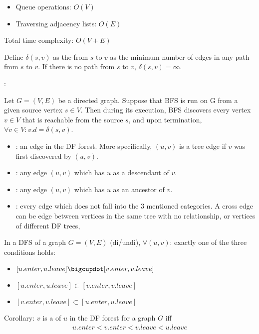     \begin{itemize}
      \item Queue operations: $O(V)$
      \item Traversing adjacency lists: $O(E)$
    \end{itemize}
    \par Total time complexity: $O(V + E)$

    \par Define $\delta(s, v)$ as the  from
      $s$ to $v$ as the minimum number of edges in any path from $s$ to $v$.
      If there is no path from $s$ to $v$, $\delta(s, v) = \infty$.
    \par {}:
      \par Let $G = (V, E)$ be a directed graph. Suppose that BFS is run on G
        from a given source vertex $s \in V$. Then during its execution, BFS
        discovers every vertex $v \in V$ that is reachable from the source $s$,
        and upon termination, $\forall v \in V: v.d = \delta(s, v)$.


    \begin{itemize}
      \item {}: an edge in the DF forest. More specifically,
        $(u, v)$ is a tree edge if $v$ was first discovered by $(u, v)$.
      \item {}: any edge $(u, v)$ which has $u$ as a descendant of $v$.
      \item {}: any  edge $(u, v)$ which has $u$ as
        an ancestor of $v$.
      \item {}: every edge which does not fall into the 3
        mentioned categories. A cross edge can be edge between vertices in
        the same tree with no relationship, or vertices of different DF trees,
    \end{itemize}

      \par In a DFS of a graph $G = (V, E)$ (di/undi), $\forall (u, v)$:
        exactly one of the three conditions holds:
        \begin{itemize}
          \item $[u.enter, u.leave] \disjoint [v.enter, v.leave]$
          \item $[u.enter, u.leave] \subset [v.enter, v.leave]$
          \item $[v.enter, v.leave] \subset [u.enter, u.leave]$
        \end{itemize}
      \par Corollary: $v$ is a  of $u$ in the DF forest
        for a graph $G$ iff
        \begin{align*}
          u.enter < v.enter < v.leave < u.leave
        \end{align*}

